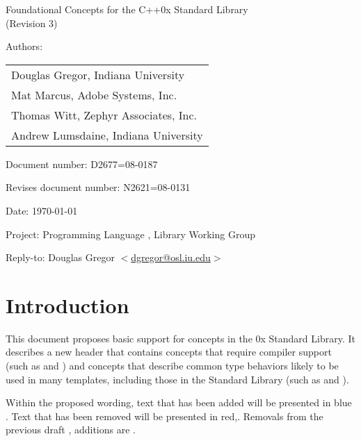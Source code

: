 \documentclass[american,twoside]{book}
\begin{document}
\raggedbottom

\begin{titlepage}
\begin{center}
\huge
Foundational Concepts for the C++0x Standard Library\\
(Revision 3)
\vspace{0.25in}
\end{center}

\normalsize
\vspace{0.25in}
\par\noindent Authors: 
\begin{tabular}[t]{l}
Douglas Gregor, Indiana University \\
Mat Marcus, Adobe Systems, Inc.\\
Thomas Witt, Zephyr Associates, Inc.\\
Andrew Lumsdaine, Indiana University
\end{tabular}\vspace{-6pt}

\par\noindent Document number: D2677=08-0187\vspace{-6pt}
\par\noindent Revises document number: N2621=08-0131\vspace{-6pt}
\par\noindent Date: \today\vspace{-6pt}
\par\noindent Project: Programming Language \Cpp{}, Library Working Group\vspace{-6pt}
\par\noindent Reply-to: Douglas Gregor $<$\href{mailto:dgregor@osl.iu.edu}{dgregor@osl.iu.edu}$>$\vspace{-6pt}

\section*{Introduction}
This document proposes basic support for concepts in the \Cpp0x
Standard Library. It describes a new header  that
contains concepts that require compiler support (such as
 and ) and concepts that describe
common type behaviors likely to be used in many templates, including
those in the Standard Library (such as  and
). 

Within the proposed wording, text that has been added
\textcolor{addclr}{will be presented in blue} . Text that has been removed will be
presented \textcolor{remclr}{in red},. Removals from the previous draft
, additions are
.


\end{titlepage}
\end{document}
